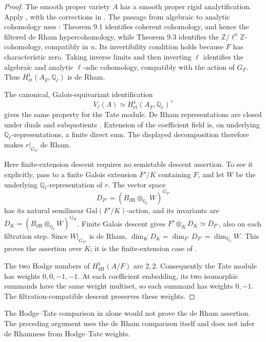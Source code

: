 \begin{proof}
The smooth proper variety $A$ has a smooth proper rigid
analytification. Apply \cite[Corollary 1.8]{scholze2013}, with the
corrections in \cite{scholze-erratum}. The passage from algebraic
to analytic cohomology uses \cite[Theorems 9.1 and 9.3]{scholze2013}:
Theorem 9.1 identifies coherent cohomology, and hence the filtered
de Rham hypercohomology, while Theorem 9.3 identifies the
$\mathbb Z/\ell^n\mathbb Z$-cohomology, compatibly in $n$.
Its invertibility condition holds because $F$ has characteristic
zero. Taking inverse limits and then inverting $\ell$ identifies
the algebraic and analytic $\ell$-adic cohomology, compatibly with
the action of $G_F$. Thus
$H^1_{\mathrm{et}}(A_{\overline F},\mathbb Q_\ell)$ is de Rham.

The canonical, Galois-equivariant identification
\cite[Part I, Theorem 12.1(a)]{milne-av}
\[
 V_\ell(A)\simeq
 H^1_{\mathrm{et}}(A_{\overline F},\mathbb Q_\ell)^\vee
\]
gives the same property for the Tate module. De Rham representations
are closed under duals and subquotients
\cite[Theorem 5.2.1 and Proposition 6.3.3]{brinon-conrad}.
Extension of the coefficient field is, on underlying
$\mathbb Q_\ell$-representations, a finite direct sum.
The displayed decomposition therefore makes $r|_{G_F}$ de Rham.

Here finite-extension descent requires no semistable descent
assertion. To see it explicitly, pass to a finite Galois extension
$F'/K$ containing $F$, and let $W$ be the underlying
$\mathbb Q_\ell$-representation of $r$. The vector space
\[
 D_{F'}=(B_{\mathrm{dR}}\otimes_{\mathbb Q_\ell}W)^{G_{F'}}
\]
has its natural semilinear $\mathrm{Gal}(F'/K)$-action, and its
invariants are
$D_K=(B_{\mathrm{dR}}\otimes_{\mathbb Q_\ell}W)^{G_K}$.
Finite Galois descent gives $F'\otimes_K D_K\simeq D_{F'}$,
also on each filtration step. Since $W|_{G_{F'}}$ is de Rham,
$\dim_K D_K=\dim_{F'}D_{F'}=\dim_{\mathbb Q_\ell}W$.
This proves the assertion over $K$; it is the finite-extension
case of \cite[Proposition 6.3.8]{brinon-conrad}.

The two Hodge numbers of $H^1_{\mathrm{dR}}(A/F)$ are $2,2$.
Consequently the Tate module has weights $0,0,-1,-1$.
At each coefficient embedding, its two isomorphic summands
have the same weight multiset, so each summand has weights $0,-1$.
The filtration-compatible descent preserves these weights.
\end{proof}

The Hodge--Tate comparison in \cite[Chapter III, Theorem 4.1]{faltings1988}
alone would not prove the de Rham assertion. The preceding argument
uses the de Rham comparison itself and does not infer de Rhamness
from Hodge--Tate weights.


